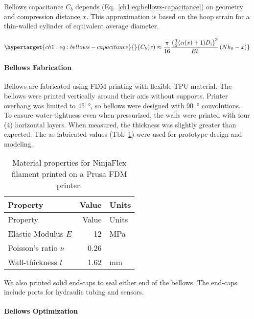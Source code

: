 Bellows capacitance \(C_b\) depends (Eq.~\ref{ch1:eq:bellows-capacitance})
on geometry and compression distance \(x\). This approximation is based
on the hoop strain for a thin-walled cylinder of equivalent average
diameter.

\begin{equation}\protect\hypertarget{ch1:eq:bellows-capacitance}{}{ C_b(x) \approx   
\frac{\pi}{16}  
\frac{\left( \frac{1}{2} (\alpha(x)+1) D_i \right)^3} {E t}   
\left( Nh_0-x \right)
}\label{ch1:eq:bellows-capacitance}\end{equation}

\hypertarget{ch1:bellows-fabrication}{%
\paragraph{Bellows Fabrication}\label{ch1:bellows-fabrication}}

Bellows are fabricated using \gls{FDM} printing with flexible \gls{TPU} material.
The bellows were printed vertically around their axis without supports.
Printer overhang was limited to \SI{45}{\degree}, so bellows were designed
with \SI{90}{\degree} convolutions. To ensure water-tightness even when
pressurized, the walls were printed with four (4) horizontal layers. When
measured, the thickness was slightly greater than expected. The
as-fabricated values (Tbl.~\ref{ch1:tbl:materials}) were used for prototype
design and modeling.


\hypertarget{ch1:tbl:materials}{}
\begin{longtable}[]{@{}lrl@{}}
\caption{\label{ch1:tbl:materials}Material properties for NinjaFlex
filament printed on a Prusa \gls{FDM} printer.}\tabularnewline
\toprule\noalign{}
Property & Value & Units \\
\midrule\noalign{}
\endfirsthead
\toprule\noalign{}
Property & Value & Units \\
\midrule\noalign{}
\endhead
\bottomrule\noalign{}
\endlastfoot
Elastic Modulus \(E\) & 12 & \si{\mega\pascal} \\
Poisson's ratio \(\nu\) & 0.26 & \\
Wall-thickness \(t\) & 1.62 & \si{\milli\meter} \\
\end{longtable}

We also printed solid end-caps to seal either end of the bellows. The
end-caps include ports for hydraulic tubing and sensors.

\hypertarget{ch1:bellows-optimization}{%
\paragraph{Bellows Optimization}\label{ch1:bellows-optimization}}

